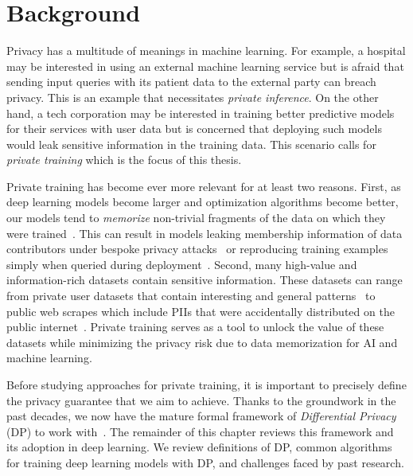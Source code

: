 \chapter{Background}\label{ch_2}

Privacy has a multitude of meanings in machine learning.
For example, a hospital may be interested in using an external machine learning service but is afraid that sending input queries with its patient data to the external party can breach privacy.
This is an example that necessitates \emph{private inference}.
On the other hand, a tech corporation may be interested in training better predictive models for their services with user data but is concerned that deploying such models would leak sensitive information in the training data.
This scenario calls for \emph{private training} which is the focus of this thesis. 

Private training has become ever more relevant for at least two reasons. 
First, as deep learning models become larger and optimization algorithms become better, our models tend to \emph{memorize} non-trivial fragments of the data on which they were trained~\cite{DBLP:journals/corr/ZhangBHRV16,feldman2020neural,feldman2020does,brown2021memorization}.
This can result in models leaking membership information of data contributors under bespoke privacy attacks~\cite{shokri2017membership} or reproducing training examples simply when queried during deployment~\cite{carlini2020extracting,nasr2023scalable}.
Second, many high-value and information-rich datasets contain sensitive information.
These datasets can range from private user datasets that contain interesting and general patterns~\cite{google-2019} to public web scrapes which include PIIs that were accidentally distributed on the public internet~\cite{carlini2020extracting}.
Private training serves as a tool to unlock the value of these datasets while minimizing the privacy risk due to data memorization for AI and machine learning.

Before studying approaches for private training, it is important to precisely define the privacy guarantee that we aim to achieve.
Thanks to the groundwork in the past decades, we now have the mature formal framework of \emph{Differential Privacy} (DP) to work with~\cite{dwork2006calibrating,dwork2014algorithmic}.
The remainder of this chapter reviews this framework and its adoption in deep learning.
We review definitions of DP, common algorithms for training deep learning models with DP, and challenges faced by past research.

